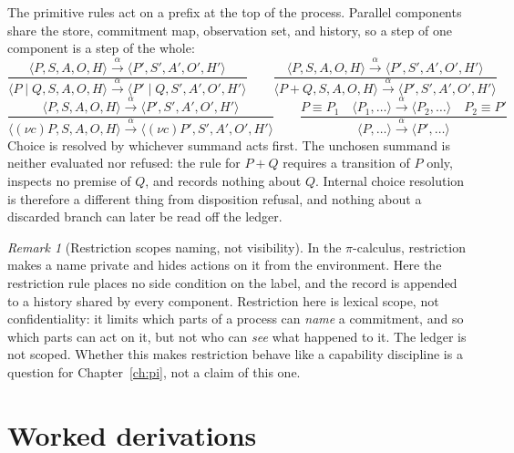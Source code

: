 \documentclass[11pt,openany]{book}
\theoremstyle{remark}
\newtheorem{remark}[theorem]{Remark}
\begin{document}
The primitive rules act on a prefix at the top of the process. Parallel
components share the store, commitment map, observation set, and history,
so a step of one component is a step of the whole:
\[
\frac{\langle P,S,A,O,H\rangle\xrightarrow{\alpha}
      \langle P',S',A',O',H'\rangle}{
\langle P\mid Q,S,A,O,H\rangle\xrightarrow{\alpha}
\langle P'\mid Q,S',A',O',H'\rangle}
\qquad
\frac{\langle P,S,A,O,H\rangle\xrightarrow{\alpha}
      \langle P',S',A',O',H'\rangle}{
\langle P+Q,S,A,O,H\rangle\xrightarrow{\alpha}
\langle P',S',A',O',H'\rangle}
\]
\[
\frac{\langle P,S,A,O,H\rangle\xrightarrow{\alpha}
      \langle P',S',A',O',H'\rangle}{
\langle (\nu c)P,S,A,O,H\rangle\xrightarrow{\alpha}
\langle (\nu c)P',S',A',O',H'\rangle}
\qquad
\frac{P\equiv P_1\quad
      \langle P_1,\ldots\rangle\xrightarrow{\alpha}\langle P_2,\ldots\rangle
      \quad P_2\equiv P'}{
\langle P,\ldots\rangle\xrightarrow{\alpha}\langle P',\ldots\rangle}
\]
Choice is resolved by whichever summand acts first. The unchosen summand
is neither evaluated nor refused: the rule for $P+Q$ requires a transition
of $P$ only, inspects no premise of $Q$, and records nothing about $Q$.
Internal choice resolution is therefore a different thing from
disposition refusal, and nothing about a discarded branch can later be
read off the ledger.

\begin{remark}[Restriction scopes naming, not visibility]
In the $\pi$-calculus, restriction makes a name private and hides actions
on it from the environment. Here the restriction rule places no side
condition on the label, and the record is appended to a history shared by
every component. Restriction here is lexical scope, not
confidentiality: it limits which parts of a process can \emph{name} a
commitment, and so which parts can act on it, but not who can \emph{see}
what happened to it. The ledger is not scoped. Whether this makes
restriction behave like a capability discipline is a question for
Chapter~\ref{ch:pi}, not a claim of this one.
\end{remark}

\section{Worked derivations}
\end{document}
